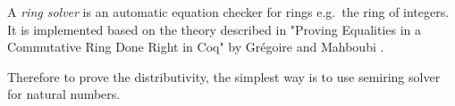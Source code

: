 \begin{remark}
A \emph{ring solver} is an automatic equation checker for rings e.g.\ the
ring of integers. It is implemented based on the theory described in
"Proving Equalities in a Commutative Ring Done Right in Coq" by
Grégoire and Mahboubi \cite{gregoire2005proving}.
\end{remark}


Therefore to prove the distributivity, the
simplest way is to use semiring
solver for natural numbers. 


\begin{code}
\\
\> \AgdaSymbol{:} \<[9]%
\>[9]\AgdaFunction{\_*\_}  \AgdaFunction{\_+\_}\<%
\\
\> \AgdaSymbol{(} \AgdaInductiveConstructor{,} \AgdaSymbol{)} \AgdaSymbol{(} \AgdaInductiveConstructor{,} \AgdaSymbol{)} \AgdaSymbol{(} \AgdaInductiveConstructor{,} \AgdaSymbol{)} \AgdaSymbol{=}   \<[40]%
\>[40]\<%
\\
\>[0]\<[2]%
\>[2]         \AgdaFunction{:*} \AgdaSymbol{(} \AgdaFunction{:+} \AgdaSymbol{)} \AgdaFunction{:+}  \AgdaFunction{:*} \AgdaSymbol{(} \AgdaFunction{:+} \AgdaSymbol{)} \AgdaFunction{:+}\<%
\\
\>[2]\<[6]%
\>[6]\AgdaSymbol{(} \AgdaFunction{:*}  \AgdaFunction{:+}  \AgdaFunction{:*}  \AgdaFunction{:+} \AgdaSymbol{(} \AgdaFunction{:*}  \AgdaFunction{:+}  \AgdaFunction{:*} \AgdaSymbol{))}\<%
\\
\>[2]\<[6]%
\>[6]\AgdaFunction{:=}\<%
\\
\>[2]\<[6]%
\>[6] \AgdaFunction{:*}  \AgdaFunction{:+}  \AgdaFunction{:*}  \AgdaFunction{:+} \AgdaSymbol{(} \AgdaFunction{:*}  \AgdaFunction{:+}  \AgdaFunction{:*} \AgdaSymbol{)} \AgdaFunction{:+}\<%
\\
\>[2]\<[6]%
\>[6]\AgdaSymbol{(} \AgdaFunction{:*} \AgdaSymbol{(} \AgdaFunction{:+} \AgdaSymbol{)} \AgdaFunction{:+}  \AgdaFunction{:*} \AgdaSymbol{(} \AgdaFunction{:+} \AgdaSymbol{)))}       \<%
\\
\end{code}

